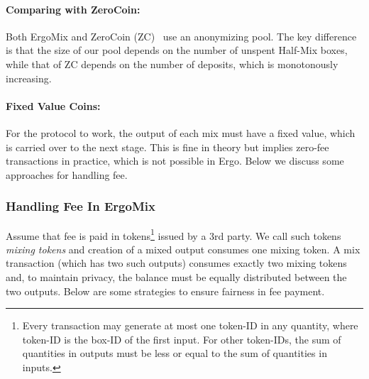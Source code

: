 \documentclass[11pt]{article}
\newcommand{\mixname}{ErgoMix\xspace}
\begin{document}

\paragraph{Comparing with ZeroCoin:} Both \mixname and ZeroCoin (ZC)~\cite{zerocoin} use an anonymizing pool. The key difference is that the size of our pool depends on the number of unspent Half-Mix boxes, while that of ZC depends on the number of deposits, which is monotonously increasing. 

\paragraph{Fixed Value Coins:} 
For the protocol to work, the output of each mix must have a fixed value, which is carried over to the next stage.
This is fine in theory but implies zero-fee transactions in practice, which is not possible in Ergo. Below we discuss some approaches for handling fee. 

\subsubsection{Handling Fee In \mixname}
Assume that fee is paid in tokens\footnote{
	 Every transaction may generate at most one token-ID in any quantity, where token-ID is the box-ID of the first input. For other token-IDs, the sum of quantities in outputs must be less or equal to the sum of quantities in inputs.} issued by a 3rd party. We call such tokens {\em mixing tokens} and creation of a mixed output consumes one mixing token. A mix transaction (which has two such outputs) consumes exactly two mixing tokens and, to maintain privacy, the balance must be equally distributed between the two outputs. Below are some strategies to ensure fairness in fee payment. 
\end{document}
